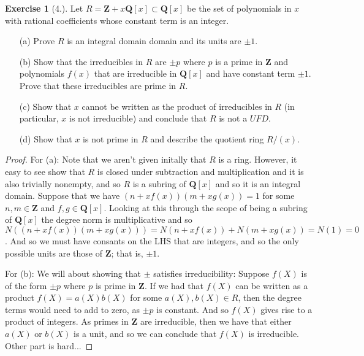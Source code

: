 \documentclass[9pt,reqno]{amsart}
\theoremstyle{definition}
\newtheorem{exercise}{Exercise}[section]
\newcommand{\zz}{\mathbf Z}
\newcommand{\qq}{\mathbf Q}
\begin{document}
\begin{exercise}[4.] Let $ R = \zz + x \qq[x] \subset \qq[x]$ be the set of polynomials in $x$ with rational coefficients whose constant term is an integer. 
\begin{itemize}
\item[(a)] Prove $R$ is an integral domain domain and its units are $ \pm 1$.
\item[(b)] Show that the irreducibles in $R$ are $\pm p$ where $p$ is a prime in $\zz$ and polynomials $f(x)$ that are irreducible in $\qq [x]$ and have constant term $\pm 1$. Prove that these irreducibles are prime in $R$.
\item[(c)] Show that $x$ cannot be written as the product of irreducibles in $R$ (in particular, $x$ is not irreducible) and conclude that $R$ is not a $UFD$.
\item[(d)] Show that $x$ is not prime in $R$ and describe the quotient ring $R/(x)$. 
\end{itemize}
	\begin{proof}
		For (a): Note that we aren't given initally that $R$ is a ring. However, it easy to see show that $R$ is closed under subtraction and multiplication and it is also trivially nonempty, and so $R$ is a subring of $\qq [x]$ and so it is an integral domain. Suppose that we have $(n+xf(x))(m+xg(x)) = 1$ for some $n,m \in \zz$ and $f, g \in \qq[x]$. Looking at this through the scope of being a subring of $\qq[x]$ the degree norm is multiplicative and so $N( (n+xf(x))(m+xg(x))) = N(n+xf(x))+ N(m + xg(x)) = N(1) = 0$. And so we must have consants on the LHS that are integers, and so the only possible units are those of $\zz$; that is, $\pm 1$.  
		
		For (b): We will about showing that $\pm$ satisfies irreducibility: Suppose $f(X)$ is of the form $\pm p$ where $p$ is prime in $\zz$. If we had that $f(X)$ can be written as a product $f(X) = a(X) b(X)$ for some $a(X), b(X) \in R$, then the degree terms would need to add to zero, as $\pm p $ is constant. And so $f(X)$ gives rise to a product of integers. As primes in $\zz$ are irreducible, then we have that either $a(X)$ or $b(X)$ is a unit, and so we can conclude that $f(X)$ is irreducible. Other part is hard...
		

\end{proof}
\end{exercise}
\end{document}
